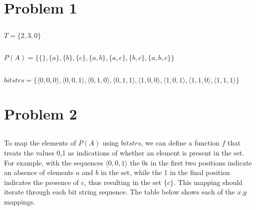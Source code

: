 \documentclass[titlepage]{article}
\begin{document}
 \maketitle

\section{Problem 1}

\subsection{}  %

\(T = \{2, 3, 0\}\)

\subsection{}  %

\(P(A) = \{\{\},\{a\},\{b\},\{c\},\{a,b\},\{a,c\},\{b,c\},\{a,b,c\}\}\)

\subsection{}  %

\( bitstrs = \{\langle0,0,0\rangle,\langle0,0,1\rangle,\langle0,1,0\rangle,\langle0,1,1\rangle,\langle1,0,0\rangle,\langle1,0,1\rangle,\langle1,1,0\rangle,\langle1,1,1\rangle\} \)


\section{Problem 2}

\subsection{}
To map the elements of $P(A)$ using $bitstrs$, we can define a function $f$ that treats the values 0,1 as indications of whether an element is present in the set. For example, with the sequences \(\langle0,0,1\rangle\) the 0s in the first two positions indicate an absence of elements $a$ and $b$ in the set, while the 1 in the final position indicates the presence of $c$, thus resulting in the set \(\{c\}\). This mapping should iterate through each bit string sequence. The table below shows each of the $x$,$y$ mappings.
\end{document}
